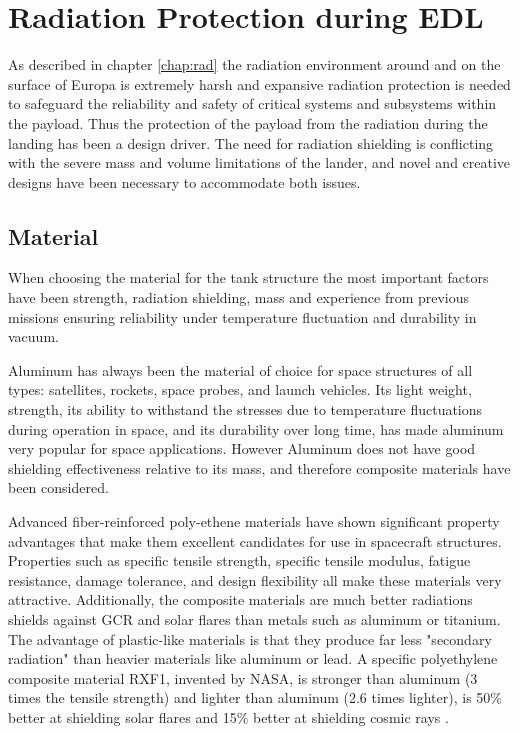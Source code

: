 \section{Radiation Protection during EDL}

As described in chapter \ref{chap:rad} the radiation environment around and on the surface of Europa is extremely harsh and expansive radiation protection is needed to safeguard the reliability
and safety of critical systems and subsystems within the payload. Thus the protection of the payload from the radiation during the landing has been a design driver. The need for radiation shielding is conflicting with the severe mass and volume limitations of the lander, and novel and creative designs have been necessary to accommodate both issues.


\subsection{Material}

When choosing the material for the tank structure the most important factors have been strength, radiation shielding, mass and experience from previous missions ensuring reliability under temperature fluctuation and durability in vacuum. 

Aluminum has always been the material of choice for space structures of all types: satellites, rockets, space probes, and launch vehicles. Its light weight, strength, its ability to withstand the stresses due to temperature fluctuations during operation in space, and its durability over long time, has made aluminum very popular for space applications. However Aluminum does not have good shielding effectiveness relative to its mass, and therefore composite materials have been considered.

Advanced fiber-reinforced poly-ethene materials have shown significant property advantages that make
them excellent candidates for use in spacecraft structures. Properties such as
specific tensile strength, specific tensile modulus, fatigue resistance, damage tolerance, and design flexibility all make these materials very attractive. Additionally, the composite materials are much better radiations shields against GCR and solar flares than metals such as aluminum or titanium. The advantage of plastic-like materials is that they produce far less "secondary radiation" than heavier materials like aluminum or lead. A specific polyethylene composite material RXF1, invented by NASA, is stronger than aluminum (3 times the tensile strength) and lighter than aluminum (2.6 times lighter), is 50$\%$ better at shielding solar flares and 15$\%$ better at shielding cosmic rays \cite{RXF1}.

